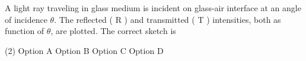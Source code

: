 
\item A light ray traveling in glass medium is incident on glass-air interface at an angle of incidence $\theta$. The reflected ( R ) and transmitted ( T ) intensities, both as function of $\theta$, are plotted. The correct sketch is

    \begin{center}
    \end{center}
    \begin{tasks}(2)
        \task Option A
        \task Option B
        \task Option C\ans
        \task Option D
    \end{tasks}

